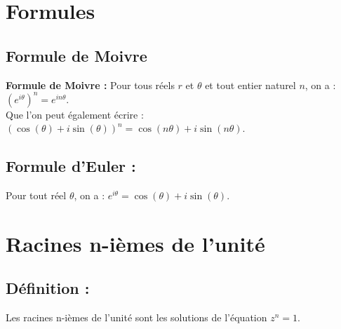 \documentclass[a4paper,12pt]{article}
\begin{document}
    \begin{center}
    \end{center}

    \section{Formules}
    \subsection{Formule de Moivre}
    \textbf{Formule de Moivre :} Pour tous réels $r$ et $\theta$ et tout entier naturel $n$, on a : $(e^{i\theta})^n = e^{in\theta}$. \\ Que l'on peut également écrire : $(\cos(\theta) + i\sin(\theta))^n = \cos(n\theta) + i\sin(n\theta)$.
    \subsection{Formule d'Euler :} Pour tout réel $\theta$, on a : $e^{i\theta} = \cos(\theta) + i\sin(\theta)$.

    \section{Racines n-ièmes de l'unité}
    \subsection{Définition :} Les racines n-ièmes de l'unité sont les solutions de l'équation $z^n = 1$.
\end{document}
